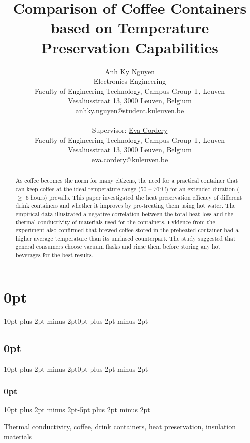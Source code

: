 \documentclass[11pt]{article}
\title{\Huge Comparison of Coffee Containers based on Temperature Preservation Capabilities}
\author
{
	\href{anhky.nguyen@student.kuleuven.be}{Anh Ky Nguyen} \\ 
	Electronics Engineering \\ 
	Faculty of Engineering Technology, Campus Group T, Leuven \\ 
	Vesaliusstraat 13, 3000 Leuven, Belgium \\ 
	anhky.nguyen@student.kuleuven.be \\ \\
	Supervisor: \href{eva.cordery@kuleuven.be}{Eva Cordery}	\\
	Faculty of Engineering Technology, Campus Group T, Leuven \\ 
	Vesaliusstraat 13, 3000 Leuven, Belgium \\ 
	eva.cordery@kuleuven.be 	
}
\date{}
\begin{document}
\maketitle
\titlespacing\section{0pt}{10pt plus 2pt minus 2pt}{0pt plus 2pt minus 2pt}
\titlespacing\subsection{0pt}{10pt plus 2pt minus 2pt}{0pt plus 2pt minus 2pt}
\titlespacing\subsubsection{0pt}{10pt plus 2pt minus 2pt}{-5pt plus 2pt minus 2pt}
\titleformat{\section}[block]{\color{black}\huge\bfseries\filcenter}{}{1em}{}
\titleformat{\subsubsection}{}{\thesubsubsection}{1em}{\itshape}
\begin{keywords}
	Thermal conductivity, coffee, drink containers, heat preservation, insulation materials
\end{keywords}

\begin{abstract}
	
As coffee becomes the norm for many citizens, the need for a practical container that can keep coffee at the ideal temperature range (50 – 70°C) for an extended duration ($\geq$ 6 hours) prevails. This paper investigated the heat preservation efficacy of different drink containers and whether it improves by pre-treating them using hot water. The empirical data illustrated a negative correlation between the total heat loss and the thermal conductivity of materials used for the containers. Evidence from the experiment also confirmed that brewed coffee stored in the preheated container had a higher average temperature than its unrinsed counterpart. The study suggested that general consumers choose vacuum flasks and rinse them before storing any hot beverages for the best results.

\end{abstract}
\end{document}
